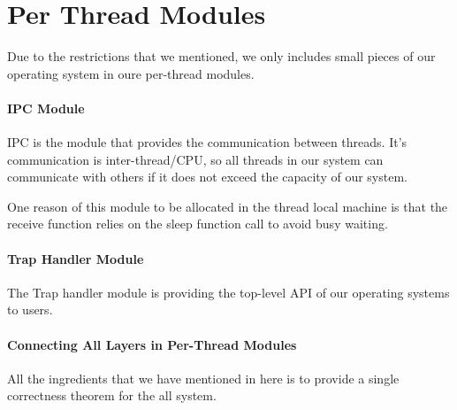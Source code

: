 \section{Per Thread Modules}
\label{chapter:certikos:sec:per-thread-modules}

Due to the restrictions that we mentioned,
we only includes small pieces of our operating system in oure per-thread modules.

\paragraph{IPC Module}

IPC is the module that provides the communication between threads.
It's communication is inter-thread/CPU, so all threads in our system can communicate with others if it does not exceed the capacity of our system. 

One reason of this module to be allocated in the thread local machine is that 
the receive function relies on the sleep function call to avoid busy waiting. 

\paragraph{Trap Handler Module}

The Trap handler module is providing the top-level API of our operating systems to users.  

\paragraph{Connecting All Layers in Per-Thread Modules}

All the ingredients that we have mentioned in here is to provide a single correctness 
theorem for the all system. 
